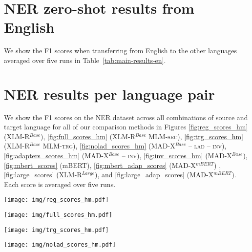 \documentclass[11pt,a4paper]{article}
\newcommand{\model}[1]{\textsc{MAD-X}}
\newcommand{\xlmr}[1]{\textsc{XLM-R}}
\newcommand{\mlmsrc}[1]{\textsc{XLM-R$^{Base}$ MLM-src}}
\newcommand{\mlmtrg}[1]{\textsc{XLM-R$^{Base}$ MLM-trg}}
\begin{document}
\section{NER zero-shot results from English}
\label{s:ner-zs-en}

We show the F1 scores when transferring from English to the other languages averaged over five runs in Table~\ref{tab:main-results-en}.

\section{NER results per language pair}
\label{s:ner-all-pairs}

We show the F1 scores on the NER dataset across all combinations of source and target language for all of our comparison methods in Figures \ref{fig:reg_scores_hm} (\xlmr{}$^{Base}$), \ref{fig:full_scores_hm} (\mlmsrc{}), \ref{fig:trg_scores_hm} (\mlmtrg{}), \ref{fig:nolad_scores_hm} (\model{}$^{Base}$ -- \textsc{lad} -- \textsc{inv}), \ref{fig:adapters_scores_hm} (\model{}$^{Base}$ -- \textsc{inv}), \ref{fig:inv_scores_hm} (\model{}$^{Base}$), \ref{fig:mbert_scores} (mBERT), \ref{fig:mbert_adap_scores} (\model{}$^{mBERT}$) , \ref{fig:large_scores} (\xlmr{}$^{Large}$), and  \ref{fig:large_adap_scores} (\model{}$^{mBERT}$). Each score is averaged over five runs. 

 \begin{figure*} \centering
\texttt{[image: img/reg\_scores\_hm.pdf]}
\caption{Mean F1 scores of XLM-R$^{Base}$ in the standard setting (\xlmr{}$^{Base}$) for cross-lingual transfer on NER.}
\label{fig:reg_scores_hm}
\end{figure*}

 \begin{figure*} \centering
\texttt{[image: img/full\_scores\_hm.pdf]}
\caption{Mean F1 scores of XLM-R$^{Base}$ with MLM fine-tuning on source language data (\mlmsrc{}) for cross-lingual transfer on NER.}
\label{fig:full_scores_hm}
\end{figure*}


 \begin{figure*} \centering
\texttt{[image: img/trg\_scores\_hm.pdf]}
\caption{Mean F1 scores of XLM-R$^{Base}$ with MLM fine-tuning on target language data (\mlmtrg{}) for cross-lingual transfer on NER.}
\label{fig:trg_scores_hm}
\end{figure*}

 \begin{figure*} \centering
\texttt{[image: img/nolad\_scores\_hm.pdf]}
\caption{Mean F1 scores of our framework without language adapters and invertible adapters (\model{}$^{Base}$ -- \textsc{lad} -- \textsc{inv}) for cross-lingual transfer on NER.}
\label{fig:nolad_scores_hm}
\end{figure*}
\end{document}

